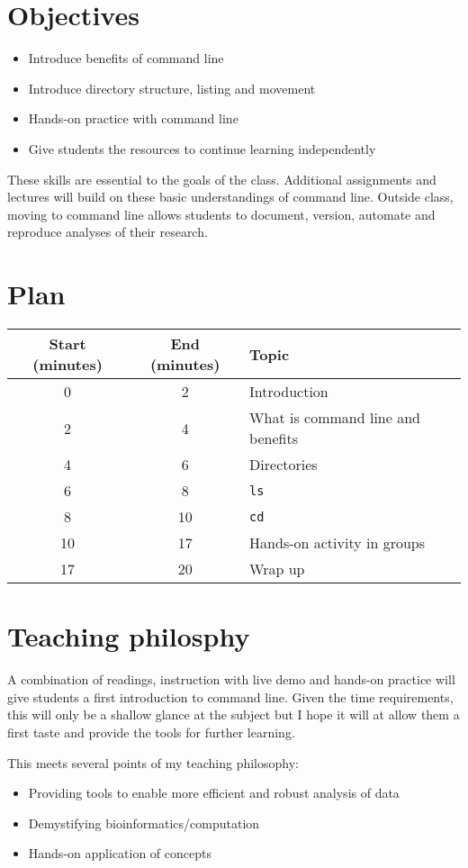 \documentclass[12pt]{article}
\begin{document}
\section*{Objectives}
\begin{itemize}
\item Introduce benefits of command line
\item Introduce directory structure, listing and movement
\item Hands-on practice with command line
\item Give students the resources to continue learning independently
\end{itemize}
These skills are essential to the goals of the class. Additional assignments and lectures will build on these basic understandings of command line. Outside class, moving to command line allows students to document, version, automate and reproduce analyses of their research.

\section*{Plan}
\begin{center}
\begin{tabular}{|c|c|l|}
\hline
Start (minutes) &End (minutes)& Topic\\
\hline
0&2 & Introduction\\
2&4 & What is command line and benefits\\
4&6 & Directories\\
6&8 & \texttt{ls}\\
8&10 & \texttt{cd}\\
10&17 & Hands-on activity in groups\\
17&20 & Wrap up\\
\hline
\end{tabular}
\end{center}

\section{Teaching philosphy}
A combination of readings, instruction with live demo and hands-on practice will give students a first introduction to command line. Given the time requirements, this will only be a shallow glance at the subject but I hope it will at allow them a first taste and provide the tools for further learning.

This meets several points of my teaching philosophy:
\begin{itemize}
\item Providing tools to enable more efficient and robust analysis of data
\item Demystifying bioinformatics/computation
\item Hands-on application of concepts
\end{itemize}
\end{document}
